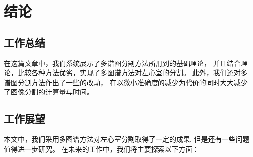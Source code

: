 
\chapter{结论}
\section{工作总结}
在这篇文章中，我们系统展示了多谱图分割方法所用到的基础理论，
并且结合理论，比较各种方法优劣，实现了多图谱方法对左心室的分割。
此外，我们还对多谱图分割方法作出了一些的改动，
在以微小准确度的减少为代价的同时大大减少了图像分割的计算量与时间。

\section{工作展望}
本文中，我们采用多图谱方法对左心室分割取得了一定的成果,
但是还有一些问题值得进一步研究。
在未来的工作中，我们将主要探索以下方面：
